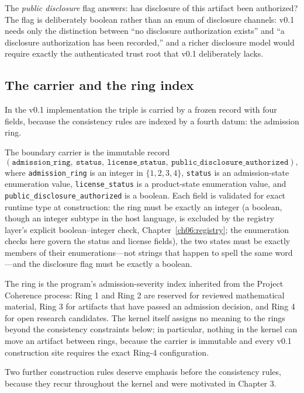 The \emph{public disclosure} flag answers: has disclosure of this artifact
been authorized? The flag is deliberately boolean rather than an enum of
disclosure channels: v0.1 needs only the distinction between ``no disclosure
authorization exists'' and ``a disclosure authorization has been recorded,''
and a richer disclosure model would require exactly the authenticated
trust root that v0.1 deliberately lacks.

\subsection{The carrier and the ring index}

In the v0.1 implementation the triple is carried by a frozen record with four
fields, because the consistency rules are indexed by a fourth datum: the
admission ring.

\begin{definition}\label{ch04:def:carrier}
The boundary carrier is the immutable record
\[
(\texttt{admission\_ring},\ \texttt{status},\ \texttt{license\_status},\
\texttt{public\_disclosure\_authorized}),
\]
where \texttt{admission\_ring} is an integer in $\{1,2,3,4\}$,
\texttt{status} is an admission-state enumeration value,
\texttt{license\_status} is a product-state enumeration value, and
\texttt{public\_disclosure\_authorized} is a boolean. Each field is validated
for exact runtime type at construction: the ring must be exactly an integer
(a boolean, though an integer subtype in the host language, is excluded by
the registry layer's explicit boolean--integer check, Chapter~\ref{ch06:registry};
the enumeration checks here govern the status and license fields),
the two states must be exactly members of their enumerations---not strings
that happen to spell the same word---and the disclosure flag must be exactly
a boolean.
\end{definition}

The ring is the program's admission-severity index inherited from the Project
Coherence process: Ring 1 and Ring 2 are reserved for reviewed mathematical
material, Ring 3 for artifacts that have passed an admission decision, and
Ring 4 for open research candidates. The kernel itself assigns no meaning to
the rings beyond the consistency constraints below; in particular, nothing in
the kernel can move an artifact between rings, because the carrier is
immutable and every v0.1 construction site requires the exact Ring-4
configuration.

Two further construction rules deserve emphasis before the consistency rules,
because they recur throughout the kernel and were motivated in Chapter 3.

